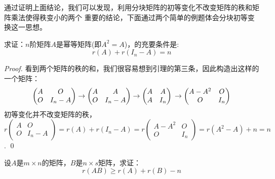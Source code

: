 通过证明上面结论，我们可以发现，利用分块矩阵的初等变化不改变矩阵的秩和矩阵乘法使得秩变小的两个
重要的结论，下面通过两个简单的例题体会分块初等变换这一思想。

\begin{proposition}
	求证：$n$阶矩阵$A$是幂等矩阵(即$A^2=A$)，的充要条件是:
	$$
		r(A) + r(I_n - A) = n
	$$
\end{proposition}

\begin{proof}
	看到两个矩阵的秩的和，我们很容易想到引理的第三条，因此构造出这样的一个矩阵：
	$$
		\begin{pmatrix}
			A & O \\
			O & I_n - A 
		\end{pmatrix}
		\to 
		\begin{pmatrix}
			A & A \\
			O & I_n - A 
		\end{pmatrix}
		\to
		\begin{pmatrix}  
			A & A \\
			A & I_n
		\end{pmatrix}
		\\
		\to
		\begin{pmatrix}
			A-A^2 & O \\
			O & I_n
		\end{pmatrix}
	$$
	初等变化并不改变矩阵的秩，$r\begin{pmatrix}
		A & O \\
		O & I_n - A 
	\end{pmatrix}=r(A) + r(I_n-A) = r\begin{pmatrix}
		A-A^2 & O \\
		O & I_n
	\end{pmatrix} = r(A^2-A)+n = n$.
	\qed
\end{proof}

\begin{proposition}[Sylvester不等式]
	设$A$是$m\times n$的矩阵，$B$是$n \times s$矩阵，求证：
	$$
		r(AB) \geq r(A) + r(B) - n
	$$
\end{proposition}

